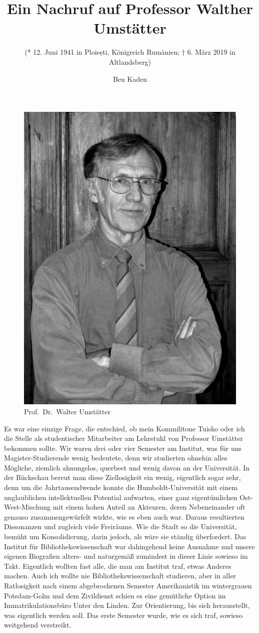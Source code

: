 \documentclass[a4paper,
fontsize=11pt,
oneside,
numbers=noperiodatend,
parskip=half-,
bibliography=totoc,
final
]{scrartcl}
\title{\LARGE{Ein Nachruf auf Professor Walther Umstätter}}%
\subtitle{(* 12. Juni 1941 in Ploiești, Königreich Rumänien; † 6. März 2019 in Altlandsberg)}
\author{Ben Kaden} %
\date{}
\begin{document}
\maketitle
\thispagestyle{fancyplain} 


\begin{figure}[h]
\centering
\includegraphics[width=.5\textwidth]{img/umstaetter.png}
\caption{Prof.~Dr.~Walter Umstätter}
\end{figure}

Es war eine einzige Frage, die entschied, ob mein Kommilitone Tuisko
oder ich die Stelle als studentischer Mitarbeiter am Lehrstuhl von
Professor Umstätter bekommen sollte. Wir waren drei oder vier Semester
am Institut, was für uns Magister-Studierende wenig bedeutete, denn wir
studierten ohnehin alles Mögliche, ziemlich ahnungslos, querbeet und
wenig davon an der Universität. In der Rückschau bereut man diese
Ziellosigkeit ein wenig, eigentlich sogar sehr, denn um die
Jahrtausendwende konnte die Humboldt-Universität mit einem unglaublichen
intellektuellen Potential aufwarten, einer ganz eigentümlichen
Ost-West-Mischung mit einem hohen Anteil an Akteuren, deren
Nebeneinander oft genauso zusammengewürfelt wirkte, wie es eben auch
war. Daraus resultierten Dissonanzen und zugleich viele Freiräume. Wie
die Stadt so die Universität, bemüht um Konsolidierung, darin jedoch,
als wäre sie ständig überfordert. Das Institut für
Bibliothekswissenschaft war dahingehend keine Ausnahme und unsere
eigenen Biografien alters- und naturgemäß zumindest in dieser Linie
sowieso im Takt. Eigentlich wollten fast alle, die man am Institut traf,
etwas Anderes machen. Auch ich wollte nie Bibliothekswissenschaft
studieren, aber in aller Ratlosigkeit nach einem abgebrochenen Semester
Amerikanistik im wintergrauen Potsdam-Golm und dem Zivildienst schien es
eine gemütliche Option im Immatrikulationsbüro Unter den Linden. Zur
Orientierung, bis sich herausstellt, was eigentlich werden soll. Das
erste Semester wurde, wie es sich traf, sowieso weitgehend verstreikt.
\end{document}
